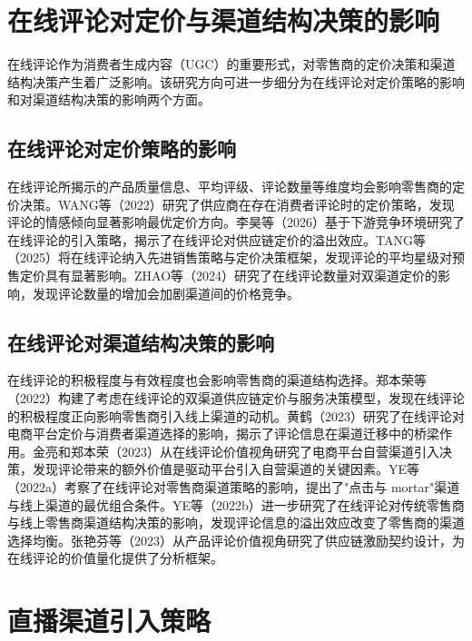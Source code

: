 \documentclass[12pt,a4paper]{article}
\begin{document}
\section{在线评论对定价与渠道结构决策的影响}

在线评论作为消费者生成内容（UGC）的重要形式，对零售商的定价决策和渠道结构决策产生着广泛影响。该研究方向可进一步细分为在线评论对定价策略的影响和对渠道结构决策的影响两个方面。

\subsection{在线评论对定价策略的影响}

在线评论所揭示的产品质量信息、平均评级、评论数量等维度均会影响零售商的定价决策。WANG等（2022）研究了供应商在存在消费者评论时的定价策略，发现评论的情感倾向显著影响最优定价方向\cite{wang2022}。李昊等（2026）基于下游竞争环境研究了在线评论的引入策略，揭示了在线评论对供应链定价的溢出效应\cite{li2026}。TANG等（2025）将在线评论纳入先进销售策略与定价决策框架，发现评论的平均星级对预售定价具有显著影响\cite{tang2025}。ZHAO等（2024）研究了在线评论数量对双渠道定价的影响，发现评论数量的增加会加剧渠道间的价格竞争\cite{zhao2024}。

\subsection{在线评论对渠道结构决策的影响}

在线评论的积极程度与有效程度也会影响零售商的渠道结构选择。郑本荣等（2022）构建了考虑在线评论的双渠道供应链定价与服务决策模型，发现在线评论的积极程度正向影响零售商引入线上渠道的动机\cite{zheng2022}。黄鹤（2023）研究了在线评论对电商平台定价与消费者渠道选择的影响，揭示了评论信息在渠道迁移中的桥梁作用\cite{huang2023}。金亮和郑本荣（2023）从在线评论价值视角研究了电商平台自营渠道引入决策，发现评论带来的额外价值是驱动平台引入自营渠道的关键因素\cite{jin2023}。YE等（2022a）考察了在线评论对零售商渠道策略的影响，提出了"点击与 mortar"渠道与线上渠道的最优组合条件\cite{ye2022a}。YE等（2022b）进一步研究了在线评论对传统零售商与线上零售商渠道结构决策的影响，发现评论信息的溢出效应改变了零售商的渠道选择均衡\cite{ye2022b}。张艳芬等（2023）从产品评论价值视角研究了供应链激励契约设计，为在线评论的价值量化提供了分析框架\cite{zhang2023}。

\section{直播渠道引入策略}
\end{document}
